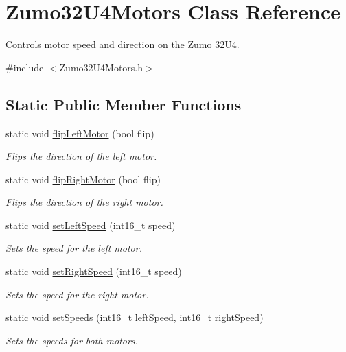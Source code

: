 \hypertarget{class_zumo32_u4_motors}{}\section{Zumo32\+U4\+Motors Class Reference}
\label{class_zumo32_u4_motors}


Controls motor speed and direction on the Zumo 32\+U4.  




{\ttfamily \#include $<$Zumo32\+U4\+Motors.\+h$>$}

\subsection*{Static Public Member Functions}
\begin{DoxyCompactItemize}
\item 
static void \hyperlink{class_zumo32_u4_motors_a18cbe58293cdc075528414861d614931}{flip\+Left\+Motor} (bool flip)
\begin{DoxyCompactList}\small\item\em Flips the direction of the left motor. \end{DoxyCompactList}\item 
static void \hyperlink{class_zumo32_u4_motors_a4e37f55575f2e468d50de17c369ad54d}{flip\+Right\+Motor} (bool flip)
\begin{DoxyCompactList}\small\item\em Flips the direction of the right motor. \end{DoxyCompactList}\item 
static void \hyperlink{class_zumo32_u4_motors_a59cb85c91d0425ae1a8116d4e6dab969}{set\+Left\+Speed} (int16\+\_\+t speed)
\begin{DoxyCompactList}\small\item\em Sets the speed for the left motor. \end{DoxyCompactList}\item 
static void \hyperlink{class_zumo32_u4_motors_a453fe0d34efe64fc44b7021878730534}{set\+Right\+Speed} (int16\+\_\+t speed)
\begin{DoxyCompactList}\small\item\em Sets the speed for the right motor. \end{DoxyCompactList}\item 
static void \hyperlink{class_zumo32_u4_motors_afdc238f045d9c919afd01f143f2fdbbb}{set\+Speeds} (int16\+\_\+t left\+Speed, int16\+\_\+t right\+Speed)
\begin{DoxyCompactList}\small\item\em Sets the speeds for both motors. \end{DoxyCompactList}\end{DoxyCompactItemize}


